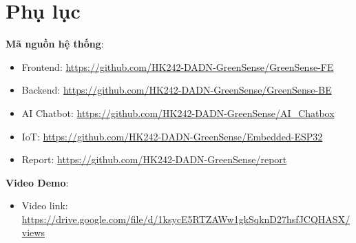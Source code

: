 \section{Phụ lục}

\textbf{Mã nguồn hệ thống}:
\begin{itemize}
    \item Frontend: \href{https://github.com/HK242-DADN-GreenSense/GreenSense-FE}{https://github.com/HK242-DADN-GreenSense/GreenSense-FE}
    \item Backend: \href{https://github.com/HK242-DADN-GreenSense/GreenSense-BE}{https://github.com/HK242-DADN-GreenSense/GreenSense-BE}
    \item AI Chatbot: \href{https://github.com/HK242-DADN-GreenSense/AI_Chatbox}{https://github.com/HK242-DADN-GreenSense/AI\_Chatbox}
    \item IoT: \href{https://github.com/HK242-DADN-GreenSense/Embedded-ESP32}{https://github.com/HK242-DADN-GreenSense/Embedded-ESP32}
    \item Report: \href{https://github.com/HK242-DADN-GreenSense/report}{https://github.com/HK242-DADN-GreenSense/report}
\end{itemize}

\textbf{Video Demo}:
\begin{itemize}
    \item Video link:  \href{https://drive.google.com/file/d/1ksycE5RTZAWw1gkSqknD27hsfJCQHASX/view}{https://drive.google.com/file/d/1ksycE5RTZAWw1gkSqknD27hsfJCQHASX/views}
\end{itemize}